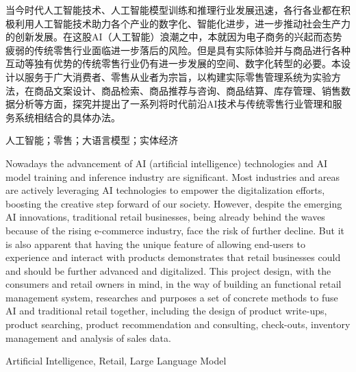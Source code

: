 \makecover

\maketitleinfo

\setcounter{page}{2}

\begin{chineseabstract}
	当今时代人工智能技术、人工智能模型训练和推理行业发展迅速，各行各业都在积极利用人工智能技术助力各个产业的数字化、智能化进步，进一步推动社会生产力的创新发展。在这股AI（人工智能）浪潮之中，本就因为电子商务的兴起而态势疲弱的传统零售行业面临进一步落后的风险。但是具有实际体验并与商品进行各种互动等独有优势的传统零售行业仍有进一步发展的空间、数字化转型的必要。本设计以服务于广大消费者、零售从业者为宗旨，以构建实际零售管理系统为实验方法，在商品文案设计、商品检索、商品推荐与咨询、商品结算、库存管理、销售数据分析等方面，探究并提出了一系列将时代前沿AI技术与传统零售行业管理和服务系统相结合的具体办法。
\end{chineseabstract}



\begin{chinesekeywords}
	人工智能；零售；大语言模型；实体经济
\end{chinesekeywords}



\begin{englishabstract}
	Nowadays the advancement of AI (artificial intelligence) technologies and AI model training and inference industry are significant. Most industries and areas are actively leveraging AI technologies to empower the digitalization efforts, boosting the creative step forward of our society. However, despite the emerging AI innovations, traditional retail businesses, being already behind the waves because of the rising e-commerce industry, face the risk of further decline. But it is also apparent that having the unique feature of allowing end-users to experience and interact with products demonstrates that retail businesses could and should be further advanced and digitalized. This project design, with the consumers and retail owners in mind, in the way of building an functional retail management system, researches and purposes a set of concrete methods to fuse AI and traditional retail together, including the design of product write-ups, product searching, product recommendation and consulting, check-outs, inventory management and analysis of sales data.
\end{englishabstract}


\begin{englishkeywords}
	Artificial Intelligence, Retail, Large Language Model
\end{englishkeywords}


\newpage
